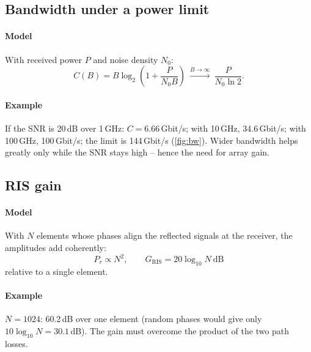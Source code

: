 \documentclass[11pt,a4paper]{article}
\begin{document}
\begin{acnfigure}
  \caption{Free-space path loss (\cref{eq:fspl}).}
  \label{fig:fspl}
\end{acnfigure}

\subsection{Bandwidth under a power limit}\label{sec:bw}
\paragraph{Model} With received power $P$ and noise density $N_0$:
\begin{equation}\label{eq:cap}
  C(B) = B \log_2\!\left(1 + \frac{P}{N_0 B}\right) \ \xrightarrow{B\to\infty}\ \frac{P}{N_0 \ln 2} .
\end{equation}
\paragraph{Example} If the SNR is 20\,dB over 1\,GHz: $C = 6.66$\,Gbit/s; with 10\,GHz, 34.6\,Gbit/s; with 100\,GHz, 100\,Gbit/s; the limit is 144\,Gbit/s
(\cref{fig:bw}). Wider bandwidth helps greatly only while the SNR stays high -- hence the need for array gain.

\begin{acnfigure}
  \caption{Capacity versus bandwidth at fixed received power (\cref{eq:cap}).}
  \label{fig:bw}
\end{acnfigure}

\subsection{RIS gain}\label{sec:ris}
\paragraph{Model} With $N$ elements whose phases align the reflected signals at the receiver, the amplitudes add coherently:
\begin{equation}\label{eq:ris}
  P_r \propto N^2 , \qquad G_{\mathrm{RIS}} = 20\log_{10} N \ \mathrm{dB}
\end{equation}
relative to a single element.
\paragraph{Example} $N = 1024$: 60.2\,dB over one element (random phases would give only $10\log_{10}N = 30.1$\,dB). The gain must overcome the product
of the two path losses.
\end{document}
